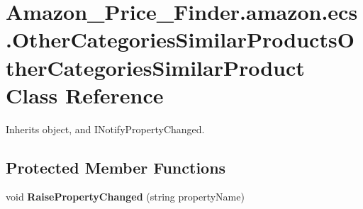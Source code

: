 \hypertarget{class_amazon___price___finder_1_1amazon_1_1ecs_1_1_other_categories_similar_products_other_categories_similar_product}{\section{Amazon\-\_\-\-Price\-\_\-\-Finder.\-amazon.\-ecs.\-Other\-Categories\-Similar\-Products\-Other\-Categories\-Similar\-Product Class Reference}
\label{class_amazon___price___finder_1_1amazon_1_1ecs_1_1_other_categories_similar_products_other_categories_similar_product}
}


 




Inherits object, and I\-Notify\-Property\-Changed.

\subsection*{Protected Member Functions}
\begin{DoxyCompactItemize}
\item 
\hypertarget{class_amazon___price___finder_1_1amazon_1_1ecs_1_1_other_categories_similar_products_other_categories_similar_product_a32e5eb73b1d64b3e5bc6b93a3ea83ac7}{void {\bfseries Raise\-Property\-Changed} (string property\-Name)}\label{class_amazon___price___finder_1_1amazon_1_1ecs_1_1_other_categories_similar_products_other_categories_similar_product_a32e5eb73b1d64b3e5bc6b93a3ea83ac7}

\end{DoxyCompactItemize}
